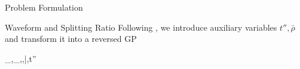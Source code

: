 \documentclass[journal]{IEEEtran}
\begin{document}
\begin{section}{Problem Formulation}
\begin{subsection}{Waveform and Splitting Ratio}
			Following \cite{Clerckx2018b}, we introduce auxiliary variables $t'',\bar{\rho}$ and transform it into a reversed GP
			\begin{mini!}
				{_{},_,\rho,\bar{\rho},t''}{}{\label{op:waveform_rgp}}{}
				\label{co:waveform_power}
				\label{co:waveform_objective}
				\label{co:waveform_rate}
			\end{mini!}


\end{subsection}
\end{section}
\end{document}
